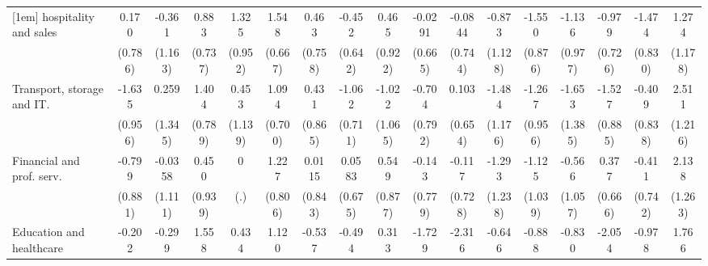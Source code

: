 {\begin{tabular}{l*{16}{c}}
[1em]
hospitality and sales&       0.170         &      -0.361         &       0.883         &       1.325         &       1.548\sym{*}  &       0.463         &      -0.452         &       0.465         &     -0.0291         &     -0.0844         &      -0.873         &      -1.550         &      -1.136         &      -0.979         &      -1.474         &       1.274         \\
                    &     (0.786)         &     (1.163)         &     (0.737)         &     (0.952)         &     (0.667)         &     (0.758)         &     (0.642)         &     (0.922)         &     (0.665)         &     (0.744)         &     (1.128)         &     (0.876)         &     (0.977)         &     (0.726)         &     (0.830)         &     (1.178)         \\
[1em]
Transport, storage and IT.&      -1.635         &       0.259         &       1.404         &       0.453         &       1.094         &       0.431         &      -1.062         &      -1.022         &      -0.704         &       0.103         &      -1.484         &      -1.267         &      -1.653         &      -1.527         &      -0.409         &       2.511\sym{*}  \\
                    &     (0.956)         &     (1.345)         &     (0.789)         &     (1.139)         &     (0.700)         &     (0.865)         &     (0.711)         &     (1.065)         &     (0.792)         &     (0.654)         &     (1.176)         &     (0.956)         &     (1.385)         &     (0.885)         &     (0.838)         &     (1.216)         \\
[1em]
Financial and prof. serv.&      -0.799         &     -0.0358         &       0.450         &           0         &       1.227         &      0.0115         &      0.0583         &       0.549         &      -0.143         &      -0.117         &      -1.293         &      -1.125         &      -0.566         &       0.377         &      -0.411         &       2.138         \\
                    &     (0.881)         &     (1.111)         &     (0.939)         &         (.)         &     (0.806)         &     (0.843)         &     (0.675)         &     (0.877)         &     (0.779)         &     (0.728)         &     (1.238)         &     (1.039)         &     (1.057)         &     (0.666)         &     (0.742)         &     (1.263)         \\
[1em]
Education and healthcare&      -0.202         &      -0.299         &       1.558         &       0.434         &       1.120         &      -0.537         &      -0.494         &       0.313         &      -1.729         &      -2.316\sym{*}  &      -0.646         &      -0.888         &      -0.830         &      -2.054         &      -0.978         &       1.766         \\

\end{tabular}}
